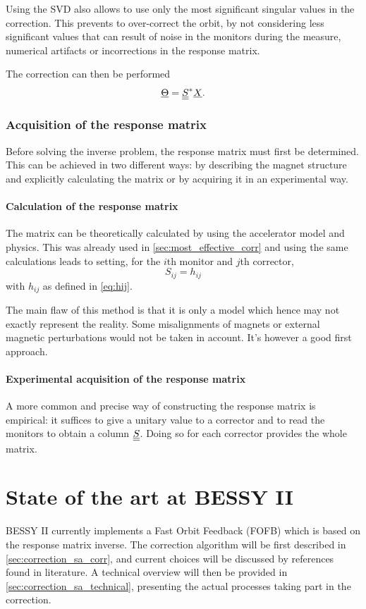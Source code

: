 Using the SVD also allows to use only the most significant singular values in the correction. This prevents to over-correct the orbit, by not considering less significant values that can result of noise in the monitors during the measure, numerical artifacts or incorrections in the response matrix.

The correction can then be performed
\begin{equation}
\underline{\Theta} = \underline{\underline{S}}^* \underline{X}.
\end{equation}

\subsubsection{Acquisition of the response matrix}
Before solving the inverse problem, the response matrix must first be determined. This can be achieved in two different ways: by describing the magnet structure and explicitly calculating the matrix or by acquiring it in an experimental way.

\paragraph{Calculation of the response matrix}
The matrix can be theoretically calculated by using the accelerator model and physics. This was already used in \cref{sec:most_effective_corr} and using the same calculations leads to setting, for the $i$th monitor and $j$th corrector,
\begin{equation}
S_{ij} = h_{ij}
\end{equation}
with $h_{ij}$ as defined in \cref{eq:hij}.

The main flaw of this method is that it is only a model which hence may not exactly represent the reality. Some misalignments of magnets or external magnetic perturbations would not be taken in account. It's however a good first approach.

\paragraph{Experimental acquisition of the response matrix}
A more common and precise way of constructing the response matrix is empirical: it suffices to give a unitary value to a corrector and to read the monitors to obtain a column $\underline{\underline{S}}$. Doing so for each corrector provides the whole matrix.


\section{State of the art at BESSY II}
\label{sec:correction_state_of_art}
BESSY II currently implements a Fast Orbit Feedback (FOFB) which is based on the response matrix inverse. The correction algorithm will be first described in \cref{sec:correction_sa_corr}, and current choices will be discussed by references found in literature. A technical overview will then be provided in \cref{sec:correction_sa_technical}, presenting the actual processes taking part in the correction.

